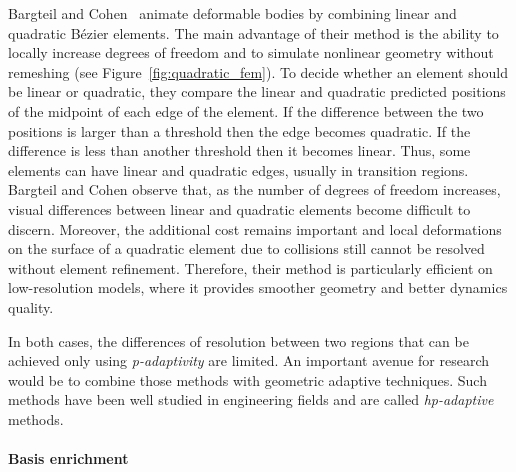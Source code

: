 Bargteil and Cohen~\cite{bargteil2014animation} animate deformable bodies by combining linear and quadratic B{\'e}zier elements.
The main advantage of their method is the ability to locally increase degrees of freedom and to simulate nonlinear geometry without remeshing (see Figure~\ref{fig:quadratic_fem}).
To decide whether an element should be linear or quadratic, they compare the linear and quadratic predicted positions of the midpoint of each edge of the element. If the difference between the two positions is larger than a threshold then the edge becomes quadratic. If the difference is less than another threshold then it becomes linear. Thus, some elements can have linear and quadratic edges, usually in transition regions. Bargteil and Cohen observe that, as the number of degrees of freedom increases, visual differences between linear and quadratic elements become difficult to discern. Moreover, the additional cost remains important and local deformations on the surface of a quadratic element due to collisions still cannot be resolved without element refinement. Therefore, their method is particularly efficient on low-resolution models, where it provides smoother geometry and better dynamics quality.

In both cases, the differences of resolution between two regions that can be achieved only using \emph{p-adaptivity} are limited. An important avenue for research would be to combine those methods with geometric adaptive techniques. Such methods have been well studied in engineering fields and are called \emph{hp-adaptive} methods.

\paragraph*{Basis enrichment}

